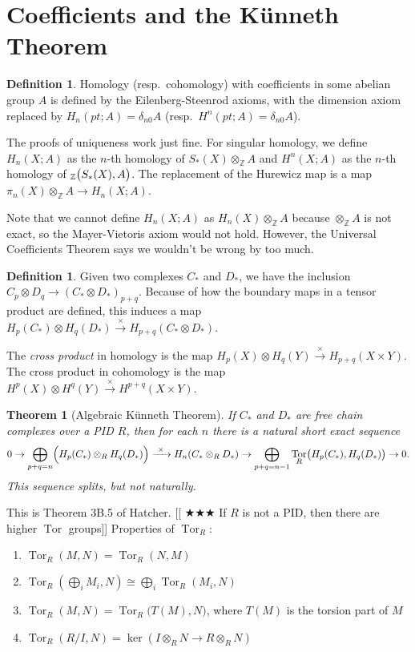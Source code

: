 \documentclass[12pt]{article}
\makeatletter
\theoremstyle{plain}
\newtheorem{theorem}[equation]{Theorem}
\theoremstyle{definition}
\newtheorem{definition}[equation]{Definition}
\theoremstyle{remark}
\newcommand{\anton}[1]{[[\index{"!@notes and corrections}
                        \ensuremath{\bigstar\bigstar\bigstar} #1]]}
\let\hom\relax %
\DeclareMathOperator{\hom}{Hom}
\DeclareMathOperator{\tor}{Tor}
\newcommand{\ZZ}{\ensuremath{\mathbb{Z}}}
\makeatother
\begin{document}
 \section{Coefficients and the K\"unneth Theorem}

 \begin{definition}
   Homology (resp.~cohomology) with coefficients in some abelian group $A$ is defined by
   the Eilenberg-Steenrod axioms, with the dimension axiom replaced by
   $H_n(pt;A)=\delta_{n0} A$ (resp.~$H^n(pt;A)=\delta_{n0}A$).
 \end{definition}
 The proofs of uniqueness work just fine. For singular homology, we define
 $H_n(X;A)$ as the $n$-th homology of $S_*(X)\otimes_\ZZ A$ and $H^n(X;A)$ as the $n$-th
 homology of $\hom_\ZZ\bigl(S_*(X),A\bigr)$. The replacement of the Hurewicz map is a map
 $\pi_n(X)\otimes_\ZZ A\to H_n(X;A)$.

 Note that we cannot define $H_n(X;A)$ as $H_n(X)\otimes_\ZZ A$ because $\otimes_\ZZ A$
 is not exact, so the Mayer-Vietoris axiom would not hold. However, the Universal
 Coefficients Theorem says we wouldn't be wrong by too much.

 \begin{definition}
   Given two complexes $C_*$ and $D_*$, we have the inclusion $C_p\otimes D_q\to
   (C_*\otimes D_*)_{p+q}$. Because of how the boundary maps in a tensor product are
   defined, this induces a map $H_p(C_*)\otimes H_q(D_*)\xrightarrow{\ \times\ }
   H_{p+q}(C_*\otimes D_*)$.

   The \emph{cross product} in homology is the map $H_p(X)\otimes
   H_q(Y)\xrightarrow{\ \times\ } H_{p+q}(X\times Y)$. The cross product in
   cohomology is the map $H^p(X)\otimes H^q(Y)\xrightarrow{\ \times\ } H^{p+q}(X\times Y)$.
 \end{definition}

 \begin{theorem}[Algebraic K\"unneth Theorem]
   If $C_*$ and $D_*$ are free chain complexes over a PID $R$, then for each $n$ there is
   a natural short exact sequence
   \[
    0\to \bigoplus_{p+q=n} \Bigl( H_p(C_*)\otimes_R H_q(D_*) \Bigr) \xrightarrow{\
    \times\ } H_n(C_*\otimes_R D_*) \to \bigoplus_{p+q=n-1}
    \tor_R\bigl(H_p(C_*),H_q(D_*)\bigr) \to 0.
   \]
   This sequence splits, but not naturally.
 \end{theorem}
 This is Theorem 3B.5 of Hatcher. \anton{If $R$ is not a PID, then there are higher
 $\tor$ groups} Properties of $\tor_R$:
 \begin{enumerate}
   \item $\tor_R(M,N)=\tor_R(N,M)$
   \item $\tor_R(\bigoplus_i M_i,N)\cong \bigoplus_i \tor_R(M_i,N)$
   \item $\tor_R(M,N)=\tor_R\bigl( T(M),N\bigr)$, where $T(M)$ is the torsion part of $M$
   \item $\tor_R(R/I,N) = \ker (I\otimes_R N\to R\otimes_R N)$
 \end{enumerate}
\end{document}
